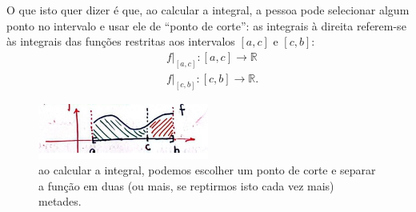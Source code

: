 \documentclass[../analysisII_notes.tex]{subfiles}
\begin{document}
O que isto quer dizer é que, ao calcular a integral, a pessoa pode selecionar algum ponto no intervalo e usar ele de ``ponto de corte'': as integrais à direita referem-se às integrais das funções restritas aos intervalos \([a, c]\) e \([c, b]\):
\begin{align*}
	 & f|_{[a, c]}:[a, c]\rightarrow \mathbb{R}  \\
	 & f|_{[c, b]}:[c, b]\rightarrow \mathbb{R}.
\end{align*}
\begin{figure}[H]
	\begin{center}
		\includegraphics[height=0.5\textheight, width=0.5\textwidth, keepaspectratio]{./Images/cut_interval_05.png}
	\end{center}
	\caption{ao calcular a integral, podemos escolher um ponto de corte e separar a função em duas (ou mais, se reptirmos isto cada vez mais) metades.}
	\label{cutint05}
\end{figure}
\end{document}
